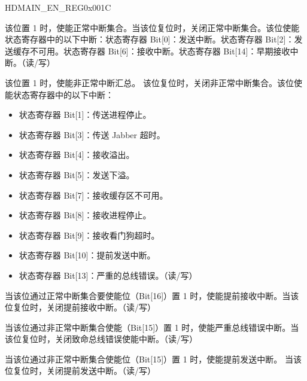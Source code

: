 \begin{register}{H}{DMAIN\_EN\_REG}{0x001C}\label{regdesc:DMAINENREG}
%
%
%
%
%
%
%
%
%
%
%
%
%
%
%
%
%
\regnewline%
\begin{regdesc}\begin{reglist}
\item [DMAIN\_NISE]该位置 1 时，使能正常中断集合。当该位复位时，关闭正常中断集合。该位使能状态寄存器中的以下中断：状态寄存器 Bit[0]：发送中断。状态寄存器 Bit[2]：发送缓存不可用。状态寄存器 Bit[6]：接收中断。状态寄存器 Bit[14]：早期接收中断。（读/写）
\item [DMAIN\_AISE]该位置 1 时，使能非正常中断汇总。 该位复位时，关闭非正常中断集合。该位使能状态寄存器中的以下中断：\begin{itemize}
\item 状态寄存器 Bit[1]：传送进程停止。
\item 状态寄存器 Bit[3]：传送 Jabber 超时。
\item 状态寄存器 Bit[4]：接收溢出。
\item 状态寄存器 Bit[5]：发送下溢。
\item 状态寄存器 Bit[7]：接收缓存区不可用。
\item 状态寄存器 Bit[8]：接收进程停止。
\item 状态寄存器 Bit[9]：接收看门狗超时。
\item 状态寄存器 Bit[10]：提前发送中断。
\item 状态寄存器 Bit[13]：严重的总线错误。（读/写）
\end{itemize}
\item [DMAIN\_ERIE] 当该位通过正常中断集合要使能位（Bit[16]）置 1 时，使能提前接收中断。当该位复位时，关闭提前接收中断。（读/写）
\item [DMAIN\_FBEE]当该位通过非正常中断集合使能（Bit[15]）置 1 时，使能严重总线错误中断。当该位复位时，关闭致命总线错误使能中断。（读/写）
\item [DMAIN\_ETIE] 当该位通过非正常中断集合使能位（Bit[15]）置 1 时，使能提前发送中断。 当该位复位时，关闭提前发送中断。（读/写）

\end{reglist}
\end{regdesc}
\end{register}
